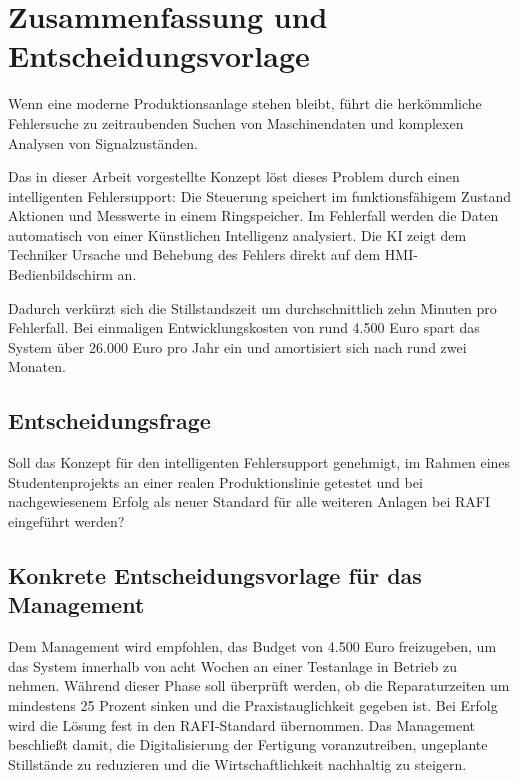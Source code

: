 \section{Zusammenfassung und Entscheidungsvorlage}

Wenn eine moderne Produktionsanlage stehen bleibt, führt die herkömmliche Fehlersuche zu zeitraubenden Suchen von Maschinendaten und komplexen Analysen von Signalzuständen. 

Das in dieser Arbeit vorgestellte Konzept löst dieses Problem durch einen intelligenten Fehlersupport: Die Steuerung speichert im funktionsfähigem Zustand Aktionen und Messwerte in einem Ringspeicher.
Im Fehlerfall  werden die Daten automatisch von einer Künstlichen Intelligenz analysiert. Die KI zeigt dem Techniker Ursache und Behebung des Fehlers direkt auf dem HMI-Bedienbildschirm an.

Dadurch verkürzt sich die Stillstandszeit um durchschnittlich zehn Minuten pro Fehlerfall. Bei einmaligen Entwicklungskosten von rund 4.500 Euro spart das System über 26.000 Euro pro Jahr ein und amortisiert sich nach rund zwei Monaten.

\subsection{Entscheidungsfrage}
Soll das Konzept für den intelligenten Fehlersupport genehmigt, im Rahmen eines Studentenprojekts an einer realen Produktionslinie getestet und bei nachgewiesenem Erfolg als neuer Standard für alle weiteren Anlagen bei RAFI eingeführt werden?

\subsection{Konkrete Entscheidungsvorlage für das Management}
Dem Management wird empfohlen, das Budget von 4.500 Euro freizugeben, um das System innerhalb von acht Wochen an einer Testanlage in Betrieb zu nehmen. Während dieser Phase soll überprüft werden, ob die Reparaturzeiten um mindestens 25 Prozent sinken und die Praxistauglichkeit gegeben ist. Bei Erfolg wird die Lösung fest in den RAFI-Standard übernommen. Das Management beschließt damit, die Digitalisierung der Fertigung voranzutreiben, ungeplante Stillstände zu reduzieren und die Wirtschaftlichkeit nachhaltig zu steigern.
